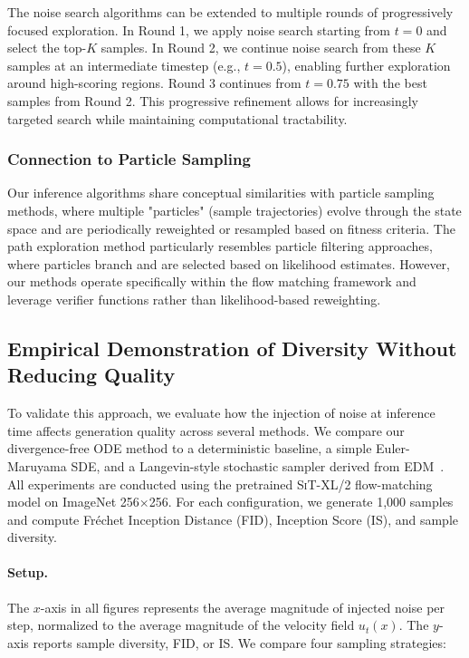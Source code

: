 \documentclass{article}
\begin{document}
The noise search algorithms can be extended to multiple rounds of progressively focused exploration. In Round 1, we apply noise search starting from $t=0$ and select the top-$K$ samples. In Round 2, we continue noise search from these $K$ samples at an intermediate timestep (e.g., $t=0.5$), enabling further exploration around high-scoring regions. Round 3 continues from $t=0.75$ with the best samples from Round 2. This progressive refinement allows for increasingly targeted search while maintaining computational tractability.

\subsubsection{Connection to Particle Sampling}

Our inference algorithms share conceptual similarities with particle sampling methods, where multiple "particles" (sample trajectories) evolve through the state space and are periodically reweighted or resampled based on fitness criteria. The path exploration method particularly resembles particle filtering approaches, where particles branch and are selected based on likelihood estimates. However, our methods operate specifically within the flow matching framework and leverage verifier functions rather than likelihood-based reweighting.

\subsection{Empirical Demonstration of Diversity Without Reducing Quality}
\label{sec:noise_study}

To validate this approach, we evaluate how the injection of noise at inference time affects generation quality across several methods. We compare our divergence-free ODE method to a deterministic baseline, a simple Euler-Maruyama SDE, and a Langevin-style stochastic sampler derived from EDM~\cite{karras2022elucidatingdesignspacediffusionbased}. All experiments are conducted using the pretrained \textsc{SiT-XL/2} flow-matching model on ImageNet 256×256. For each configuration, we generate 1,000 samples and compute Fréchet Inception Distance (FID), Inception Score (IS), and sample diversity.

\paragraph{Setup.}
The $x$-axis in all figures represents the average magnitude of injected noise per step, normalized to the average magnitude of the velocity field \( u_t(x) \). The $y$-axis reports sample diversity, FID, or IS. We compare four sampling strategies:
\end{document}
